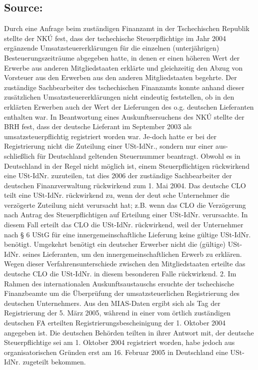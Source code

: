 \documentclass[10pt]{article}
\begin{document}
\subsection*{Source:}

Durch eine Anfrage beim zuständigen Finanzamt in der Tschechischen Republik stellte der NKÚ fest, dass der tschechische Steuerpﬂichtige im Jahr 2004 ergänzende Umsatzsteuererklärungen für die einzelnen (unterjährigen) Besteuerungszeiträume abgegeben hatte, in denen er einen höheren Wert der Erwerbe aus anderen Mitgliedstaaten erklärte und gleichzeitig den Abzug von Vorsteuer aus den Erwerben aus den anderen Mitgliedstaaten begehrte.
Der zuständige Sachbearbeiter des tschechischen Finanzamts konnte anhand dieser zusätzlichen Umsatzsteuererklärungen nicht eindeutig feststellen, ob in den erklärten Erwerben auch der Wert der Lieferungen des o.g. deutschen Lieferanten enthalten war.
In Beantwortung eines Auskunftsersuchens des NKÚ stellte der BRH fest, dass der deutsche Lieferant im September 2003 als umsatzsteuerpﬂichtig registriert worden war.
Je-doch hatte er bei der Registrierung nicht die Zuteilung einer USt-IdNr., sondern nur einer aus- schließlich für Deutschland geltenden Steuernummer beantragt.
Obwohl es in Deutschland in der Regel nicht möglich ist, einem Steuerpﬂichtigen rückwirkend eine USt-IdNr. zuzuteilen, tat dies 2006 der zuständige Sachbearbeiter der deutschen Finanzverwaltung rückwirkend zum 1. Mai 2004.
Das deutsche CLO teilt eine USt-IdNr. rückwirkend zu, wenn der deut sche Unternehmer die verzögerte Zuteilung nicht verursacht hat; z.B. wenn das CLO die Verzögerung nach Antrag des Steuerpﬂichtigen auf Erteilung einer USt-IdNr. verursachte.
In diesem Fall erteilt das CLO die USt-IdNr. rückwirkend, weil der Unternehmer nach § 6 UStG für eine innergemeinschaftliche Lieferung keine gültige USt-IdNr. benötigt.
Umgekehrt benötigt ein deutscher Erwerber nicht die (gültige) USt-IdNr. seines Lieferanten, um den innergemeinschaftlichen Erwerb zu erklären.
Wegen dieser Verfahrensunterschiede zwischen den Mitgliedstaaten erteilte das deutsche CLO die USt-IdNr. in diesem besonderen Falle rückwirkend.
2.
Im Rahmen des internationalen Auskunftsaustauschs ersuchte der tschechische Finanzbeamte um die Überprüfung der umsatzsteuerlichen Registrierung des deutschen Unternehmers.
Aus den MIAS-Daten ergibt sich als Tag der Registrierung der 5.  März 2005, während in einer vom örtlich zuständigen deutschen FA erteilten Registrierungsbescheinigung der 1. Oktober 2004 angegeben ist.
Die deutschen Behörden teilten in ihrer Antwort mit, der deutsche Steuerpﬂichtige sei am 1. Oktober 2004 registriert worden, habe jedoch aus organisatorischen Gründen erst am 16. Februar 2005 in Deutschland eine USt-IdNr. zugeteilt bekommen.
\end{document}
